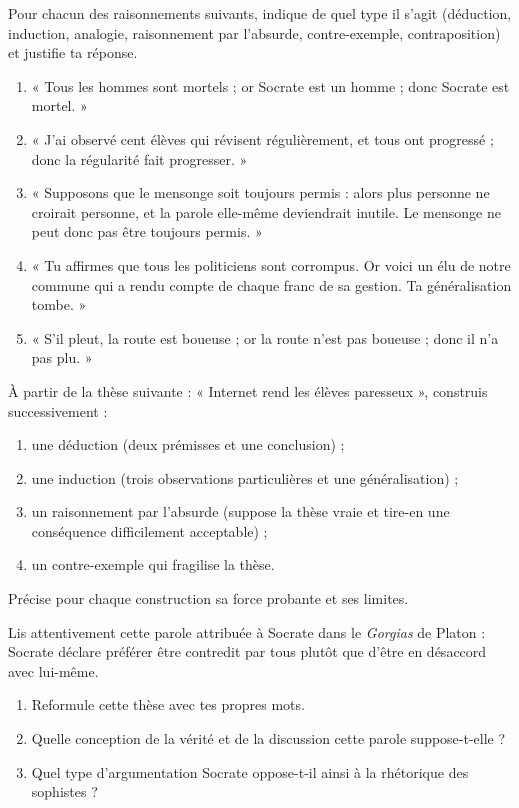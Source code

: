 \documentclass[11pt]{article}
\begin{document}
\begin{exercice}
Pour chacun des raisonnements suivants, indique de quel type il s'agit (déduction, induction, analogie, raisonnement par l'absurde, contre-exemple, contraposition) et justifie ta réponse.
\begin{enumerate}
\item « Tous les hommes sont mortels ; or Socrate est un homme ; donc Socrate est mortel. »
\item « J'ai observé cent élèves qui révisent régulièrement, et tous ont progressé ; donc la régularité fait progresser. »
\item « Supposons que le mensonge soit toujours permis : alors plus personne ne croirait personne, et la parole elle-même deviendrait inutile. Le mensonge ne peut donc pas être toujours permis. »
\item « Tu affirmes que tous les politiciens sont corrompus. Or voici un élu de notre commune qui a rendu compte de chaque franc de sa gestion. Ta généralisation tombe. »
\item « S'il pleut, la route est boueuse ; or la route n'est pas boueuse ; donc il n'a pas plu. »
\end{enumerate}
\end{exercice}

\begin{exercice}
À partir de la thèse suivante : « Internet rend les élèves paresseux », construis successivement :
\begin{enumerate}
\item une déduction (deux prémisses et une conclusion) ;
\item une induction (trois observations particulières et une généralisation) ;
\item un raisonnement par l'absurde (suppose la thèse vraie et tire-en une conséquence difficilement acceptable) ;
\item un contre-exemple qui fragilise la thèse.
\end{enumerate}
Précise pour chaque construction sa force probante et ses limites.
\end{exercice}

\begin{exercice}
Lis attentivement cette parole attribuée à Socrate dans le \emph{Gorgias} de Platon : Socrate déclare préférer être contredit par tous plutôt que d'être en désaccord avec lui-même.
\begin{enumerate}
\item Reformule cette thèse avec tes propres mots.
\item Quelle conception de la vérité et de la discussion cette parole suppose-t-elle ?
\item Quel type d'argumentation Socrate oppose-t-il ainsi à la rhétorique des sophistes ?
\end{enumerate}
\end{exercice}
\end{document}
